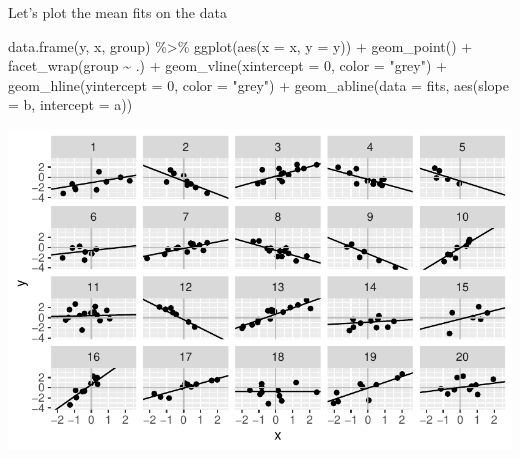 \documentclass[
  letterpaper,
  DIV=11,
  numbers=noendperiod]{scrartcl}
\newenvironment{Shaded}{\begin{snugshade}}{\end{snugshade}}
\newcommand{\AttributeTok}[1]{\textcolor[rgb]{0.40,0.45,0.13}{#1}}
\newcommand{\DecValTok}[1]{\textcolor[rgb]{0.68,0.00,0.00}{#1}}
\newcommand{\FunctionTok}[1]{\textcolor[rgb]{0.28,0.35,0.67}{#1}}
\newcommand{\NormalTok}[1]{\textcolor[rgb]{0.00,0.23,0.31}{#1}}
\newcommand{\OtherTok}[1]{\textcolor[rgb]{0.00,0.23,0.31}{#1}}
\newcommand{\SpecialCharTok}[1]{\textcolor[rgb]{0.37,0.37,0.37}{#1}}
\newcommand{\StringTok}[1]{\textcolor[rgb]{0.13,0.47,0.30}{#1}}
\begin{document}
\begin{Shaded}
\end{Shaded}

Let's plot the mean fits on the data

\begin{Shaded}
\begin{Highlighting}[]
\FunctionTok{data.frame}\NormalTok{(y, x, group) }\SpecialCharTok{\%\textgreater{}\%} 
  \FunctionTok{ggplot}\NormalTok{(}\FunctionTok{aes}\NormalTok{(}\AttributeTok{x =}\NormalTok{ x, }\AttributeTok{y =}\NormalTok{ y)) }\SpecialCharTok{+}
  \FunctionTok{geom\_point}\NormalTok{() }\SpecialCharTok{+}
  \FunctionTok{facet\_wrap}\NormalTok{(group }\SpecialCharTok{\textasciitilde{}}\NormalTok{ .) }\SpecialCharTok{+}
  \FunctionTok{geom\_vline}\NormalTok{(}\AttributeTok{xintercept =} \DecValTok{0}\NormalTok{, }\AttributeTok{color =} \StringTok{"grey"}\NormalTok{) }\SpecialCharTok{+}
  \FunctionTok{geom\_hline}\NormalTok{(}\AttributeTok{yintercept =} \DecValTok{0}\NormalTok{, }\AttributeTok{color =} \StringTok{"grey"}\NormalTok{) }\SpecialCharTok{+}
  \FunctionTok{geom\_abline}\NormalTok{(}\AttributeTok{data =}\NormalTok{ fits, }\FunctionTok{aes}\NormalTok{(}\AttributeTok{slope =}\NormalTok{ b, }\AttributeTok{intercept =}\NormalTok{ a))}
\end{Highlighting}
\end{Shaded}

\includegraphics{varying_intercepts_varying_slopes_files/figure-pdf/unnamed-chunk-7-1.pdf}
\end{document}
